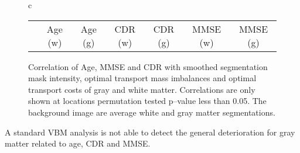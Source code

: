 \documentclass{llncs}
\begin{document}
\begin{figure}[tb]
\begin{tabular}{c}
\begin{tabular}{l|cc|cc|cc}
%
& \parbox[b][4mm]{12mm}{Age (w)} 
& \parbox[b][4mm]{12mm}{Age (g)} 
& \parbox[b][4mm]{14mm}{CDR (w)} 
& \parbox[b][4mm]{14mm}{CDR (g) }
& \parbox[b][4mm]{18mm}{MMSE (w)}
& \parbox[b][4mm]{18mm}{MMSE (g)}
\end{tabular}
\end{tabular}
\caption{\label{fig:cor-oasis-gray}
Correlation of Age, MMSE and CDR with smoothed segmentation mask intensity,
optimal transport mass imbalances and optimal transport costs of gray and white
matter.  Correlations are only shown at locations permutation tested p--value
less than 0.05. The background image are average white and gray matter
segmentations. 
} 
\end{figure} \endgroup
A standard VBM analysis is not able to detect the general deterioration for
gray matter related to age, CDR and MMSE.
\end{document}

